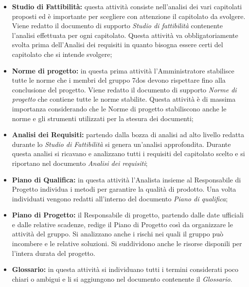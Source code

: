 \begin{itemize}

	\item \textbf{Studio di Fattibilità:} questa attività consiste nell'analisi dei vari capitolati proposti ed è importante per scegliere con attenzione il capitolato da svolgere. Viene redatto il documento di supporto \textit{Studio di fattibilità} contenente l'analisi effettuata per ogni capitolato. Questa attività va obbligatoriamente svolta prima dell'Analisi dei requisiti in quanto bisogna essere certi del capitolato che si intende svolgere;

	\item \textbf{Norme di progetto:} in questa prima attività l'Amministratore stabilisce tutte le norme che i membri del gruppo 7dos devono rispettare fino alla conclusione del progetto. Viene redatto il documento di supporto \textit{Norme di progetto} che contiene tutte le norme stabilite. Questa attività è di massima importanza considerando che le Norme di progetto stabiliscono anche le norme e gli strumenti utilizzati per la stesura dei documenti;

	\item \textbf{Analisi dei Requisiti:} partendo dalla bozza di analisi ad alto livello redatta durante lo \textit{Studio di Fattibilità} si genera un'analisi approfondita. Durante questa analisi si ricavano e analizzano tutti i requisiti del capitolato scelto e si riportano nel documento \textit{Analisi dei requisiti};

	\item \textbf{Piano di Qualifica:} in questa attività l'Analista insieme al Responsabile di Progetto individua i metodi per garantire la qualità di prodotto. Una volta individuati vengono redatti all'interno del documento \textit{Piano di qualifica};

	\item \textbf{Piano di Progetto:} il Responsabile di progetto, partendo dalle date ufficiali e dalle relative scadenze, redige il Piano di Progetto così da organizzare le attività del gruppo. Si analizzano anche i rischi nei quali il gruppo può incombere e le relative soluzioni. Si suddividono anche le risorse disponili per l'intera durata del progetto.

	\item \textbf{Glossario:} in questa attività si individuano tutti i termini considerati poco chiari o ambigui e li si aggiungono nel documento contenente il \textit{Glossario}.

\end{itemize}

